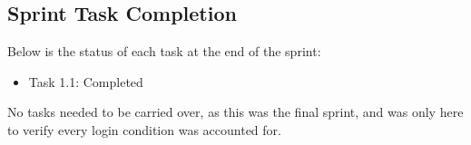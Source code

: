\documentclass{scrreprt}
\begin{document}
% 
\subsection{Sprint Task Completion}

Below is the status of each task at the end of the sprint:

\begin{itemize}
    \item Task 1.1: Completed
\end{itemize}

No tasks needed to be carried over, as this was the final sprint, and was only here to verify every login condition was accounted for.

% 
% 
% 
\end{document}
